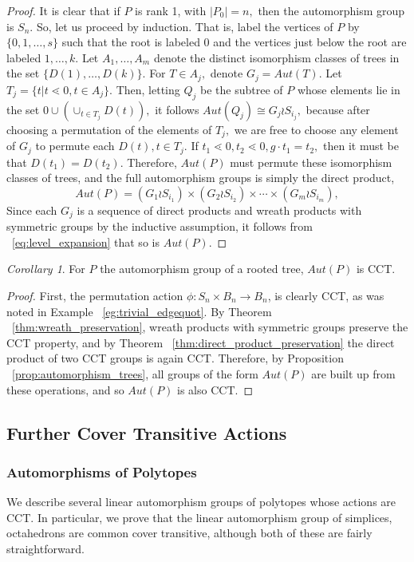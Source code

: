 \documentclass[10 pt]{amsart}
\theoremstyle{plain}
\theoremstyle{definition}
\theoremstyle{remark}
\numberwithin{equation}{section}
\newtheorem{cor}[thm]{Corollary}
\theoremstyle{remark}
\newcommand\ssec{\subsection}
\newcommand\sssec{\subsubsection}
\begin{document}
\begin{proof}
It is clear that if $P$ is rank 1, with $|P_0| = n,$ then the automorphism group is $S_n.$ So, let us proceed by induction. That is, label the vertices of $P$ by $\{0,1,\ldots, s\}$ such that the root is labeled $0$ and the vertices just below the root are labeled $1, \ldots, k.$ Let $A_1,\ldots, A_m$ denote the distinct isomorphism classes of trees in the set $\{D(1),\ldots, D(k)\}.$ For $T \in A_j,$ denote $G_j = Aut(T).$ 
Let $T_j = \{t|t\lessdot 0,t \in A_j\}.$ Then, letting $Q_j$ be the subtree of $P$ whose elements lie in the set $0 \cup (\cup_{t \in T_j} D(t)),$ it follows $Aut(Q_j) \cong G_j \wr S_{i_j},$ because after choosing a permutation of the elements of $T_j,$ we are free to choose any element of $G_j$ to permute each $D(t),t \in T_j$. If $t_1 \lessdot 0,t_2 \lessdot 0,g \cdot t_1 = t_2,$ then it must be that $D(t_1) = D(t_2).$ Therefore, $Aut(P)$ must permute these isomorphism classes of trees, and the full automorphism groups is simply the direct product, 
\begin{equation}
\label{eq:level_expansion}
Aut(P) = (G_1 \wr S_{i_1}) \times (G_2 \wr S_{i_2}) \times \cdots \times (G_m\wr S_{i_m}),
\end{equation}
Since each $G_j$ is a sequence of direct products and wreath products with symmetric groups by the inductive assumption, it follows from ~\eqref{eq:level_expansion} that so is $Aut(P).$
\end{proof}

\begin{cor}
For $P$ the automorphism group of a rooted tree, $Aut(P)$ is CCT.
\end{cor}
\begin{proof}
First, the permutation action $\phi:S_n \times B_n \rightarrow B_n$, is clearly CCT, as was noted in Example ~\ref{eg:trivial_edgequot}. By Theorem ~\ref{thm:wreath_preservation}, wreath products with symmetric groups preserve the CCT property, and by Theorem ~\ref{thm:direct_product_preservation} the direct product of two CCT groups is again CCT. Therefore, by Proposition ~\ref{prop:automorphism_trees}, all groups of the form $Aut(P)$ are built up from these operations, and so $Aut(P)$ is also CCT.
\end{proof}

\ssec{Further Cover Transitive Actions}

\sssec{Automorphisms of Polytopes}
We describe several linear automorphism groups of polytopes whose actions are CCT. In particular, we prove that the linear automorphism group of simplices, octahedrons are common cover transitive, although both of these are fairly straightforward.
\end{document}

